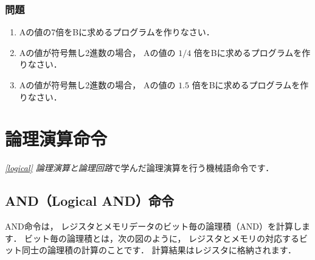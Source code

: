 \vfill
\subsubsection{問題}
\begin{enumerate}
\item Aの値の7倍をBに求めるプログラムを作りなさい．
\item Aの値が符号無し2進数の場合，
  Aの値の $1/4$ 倍をBに求めるプログラムを作りなさい．
\item Aの値が符号無し2進数の場合，
  Aの値の $1.5$ 倍をBに求めるプログラムを作りなさい．
\end{enumerate}
\vfill

\newpage
\section{論理演算命令}
\emph{\ref{logical} 論理演算と論理回路}で学んだ論理演算を行う機械語命令です．

\subsection{AND（Logical AND）命令}
AND命令は，
レジスタとメモリデータのビット毎の論理積（AND）を計算します．
ビット毎の論理積とは，次の図のように，
レジスタとメモリの対応するビット同士の論理積の計算のことです．
計算結果はレジスタに格納されます．

\begin{center}
\end{center}

